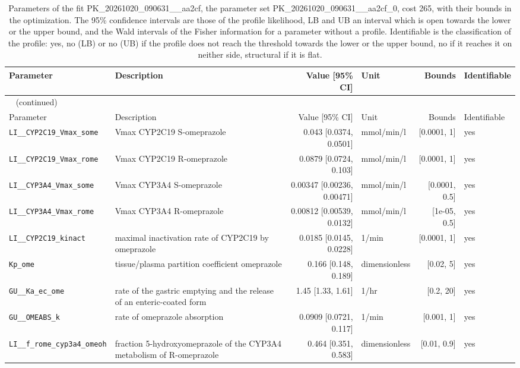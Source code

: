 \documentclass{article}
\begin{document}
\begin{longtable}{llrlrl}
\caption{Parameters of the fit PK\_20261020\_090631\_\_aa2cf, the parameter set PK\_20261020\_090631\_\_aa2cf\_0, cost 265, with their bounds in the optimization. The 95\% confidence intervals are those of the profile likelihood, LB and UB an interval which is open towards the lower or the upper bound, and the Wald intervals of the Fisher information for a parameter without a profile. Identifiable is the classification of the profile: yes, no (LB) or no (UB) if the profile does not reach the threshold towards the lower or the upper bound, no if it reaches it on neither side, structural if it is flat.}\label{tab:parameters:PK_20261020_090631__aa2cf} \\
\toprule
Parameter & Description & Value [95\% CI] & Unit & Bounds & Identifiable \\
\midrule
\endfirsthead
\multicolumn{6}{l}{\small\tablename~\thetable{} (continued)} \\
\toprule
Parameter & Description & Value [95\% CI] & Unit & Bounds & Identifiable \\
\midrule
\endhead
\bottomrule
\endlastfoot
\texttt{LI\_\_CYP2C19\_Vmax\_some} & Vmax CYP2C19 S-omeprazole & 0.043 [0.0374, 0.0501] & mmol/min/l & [0.0001, 1] & yes \\
\texttt{LI\_\_CYP2C19\_Vmax\_rome} & Vmax CYP2C19 R-omeprazole & 0.0879 [0.0724, 0.103] & mmol/min/l & [0.0001, 1] & yes \\
\texttt{LI\_\_CYP3A4\_Vmax\_some} & Vmax CYP3A4 S-omeprazole & 0.00347 [0.00236, 0.00471] & mmol/min/l & [0.0001, 0.5] & yes \\
\texttt{LI\_\_CYP3A4\_Vmax\_rome} & Vmax CYP3A4 R-omeprazole & 0.00812 [0.00539, 0.0132] & mmol/min/l & [1e-05, 0.5] & yes \\
\texttt{LI\_\_CYP2C19\_kinact} & maximal inactivation rate of CYP2C19 by omeprazole & 0.0185 [0.0145, 0.0228] & 1/min & [0.0001, 1] & yes \\
\texttt{Kp\_ome} & tissue/plasma partition coefficient omeprazole & 0.166 [0.148, 0.189] & dimensionless & [0.02, 5] & yes \\
\texttt{GU\_\_Ka\_ec\_ome} & rate of the gastric emptying and the release of an enteric-coated form & 1.45 [1.33, 1.61] & 1/hr & [0.2, 20] & yes \\
\texttt{GU\_\_OMEABS\_k} & rate of omeprazole absorption & 0.0909 [0.0721, 0.117] & 1/min & [0.001, 1] & yes \\
\texttt{LI\_\_f\_rome\_cyp3a4\_omeoh} & fraction 5-hydroxyomeprazole of the CYP3A4 metabolism of R-omeprazole & 0.464 [0.351, 0.583] & dimensionless & [0.01, 0.9] & yes \\

\end{longtable}
\end{document}
